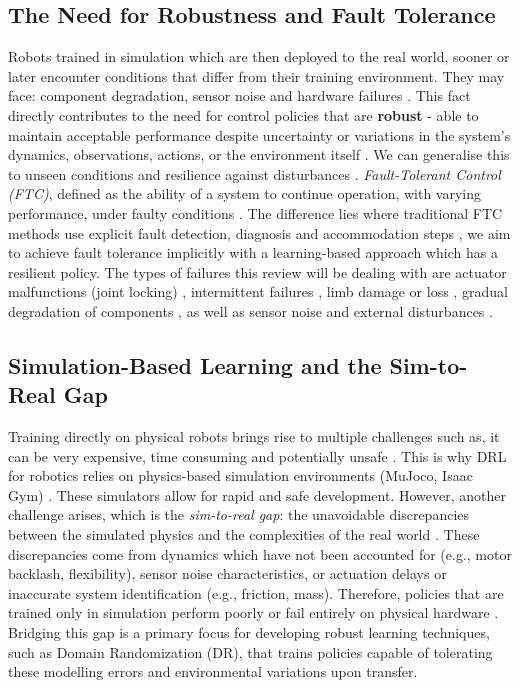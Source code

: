 \documentclass[12pt, a4paper]{article} %
\begin{document}
\subsection{The Need for Robustness and Fault Tolerance}
Robots trained in simulation which are then deployed to the real world, sooner or later encounter conditions that differ from their training environment. They may face: component degradation, sensor noise and hardware failures \citep{liu2023saving, pham2024adaptive}. This fact directly contributes to the need for control policies that are \textbf{robust} - able to maintain acceptable performance despite uncertainty or variations in the system's dynamics, observations, actions, or the environment itself \citep{pinto2017robust, glossop2022characterising}. We can generalise this to unseen conditions and resilience against disturbances  \citep{zhou1998essentials}. \textit{Fault-Tolerant Control (FTC)}, defined as the ability of a system to continue operation, with varying performance, under faulty conditions \citep[as cited by][]{ahmed2020fault, blanke1997}. The difference lies where traditional FTC methods use explicit fault detection, diagnosis and accommodation steps \citep{ahmed2020fault, zhang2008bibliographical}, we aim to achieve fault tolerance implicitly with a learning-based approach which has a resilient policy. The types of failures this review will be dealing with are actuator malfunctions (joint locking) \citep{liu2023saving}, intermittent failures \citep{pham2024adaptive}, limb damage or loss \citep{cully2015robots, chatzilygeroudis2018reset, bongard2006resilient}, gradual degradation of components \citep{ahmed2020fault}, as well as sensor noise and external disturbances \citep{glossop2022characterising, pinto2017robust}.

\subsection{Simulation-Based Learning and the Sim-to-Real Gap}
Training directly on physical robots brings rise to multiple challenges such as, it can be very expensive, time consuming and potentially unsafe \citep{kober2013survey}. This is why DRL for robotics relies on physics-based simulation environments (MuJoco, Isaac Gym) \citep{todorov2012mujoco,makoviychuk2021isaac}. These simulators allow for rapid and safe development. However, another challenge arises, which is the \textit{sim-to-real gap}: the unavoidable discrepancies between the simulated physics and the complexities of the real world \citep{zhao2020sim}. These discrepancies come from dynamics which have not been accounted for (e.g., motor backlash, flexibility), sensor noise characteristics, or actuation delays \citep{peng2018sim} or inaccurate system identification (e.g., friction, mass). Therefore, policies that are trained only in simulation perform poorly or fail entirely on physical hardware \citep{pinto2017robust, rajeswaran2016epopt}. Bridging this gap is a primary focus for developing robust learning techniques, such as Domain Randomization (DR), that trains policies capable of tolerating these modelling errors and environmental variations upon transfer.
\end{document}
